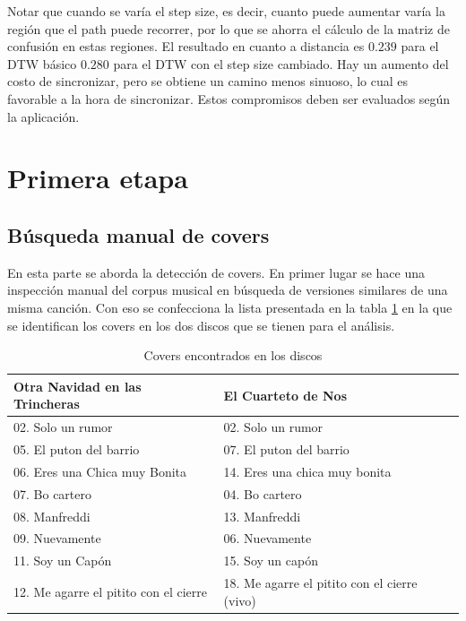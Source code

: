 \documentclass{article}
\begin{document}
Notar que cuando se varía el step size, es decir, cuanto puede aumentar varía la región que el path puede recorrer, por lo que se ahorra el cálculo de la matriz de confusión en estas regiones. El resultado en cuanto a distancia es $0.239$ para el DTW básico $0.280$ para el DTW con el step size cambiado. Hay un aumento del costo de sincronizar, pero se obtiene un camino menos sinuoso, lo cual es favorable a la hora de sincronizar. Estos compromisos deben ser evaluados según la aplicación. 


\section{Primera etapa}

\subsection{Búsqueda manual de covers}
En esta parte se aborda la detección de covers. 
En primer lugar se hace una inspección manual del corpus musical en búsqueda de versiones similares de una misma canción. Con eso se confecciona la lista presentada en la tabla \ref{canciones} en la que se identifican los covers en los dos discos que se tienen para el análisis. 

\begin{table}[!h]
\centering
\begin{tabular}{|l|l|}
\hline
\textbf{Otra Navidad en las Trincheras}  & \textbf{El Cuarteto de Nos}              \\
\hline
02. Solo un rumor       & 02. Solo un rumor       \\
05. El puton del barrio & 07. El puton del barrio \\
06. Eres una Chica muy Bonita   & 14. Eres una chica muy bonita \\
07. Bo cartero          & 04. Bo cartero          \\
08. Manfreddi       &   13. Manfreddi   \\
09. Nuevamente          & 06. Nuevamente    \\
11. Soy un Capón    & 15. Soy un capón  \\
12. Me agarre el pitito con el cierre & 18. Me agarre el pitito con el cierre (vivo) \\
\hline
\end{tabular}
\caption{Covers encontrados en los discos}
\label{canciones}
\end{table}
\end{document}
